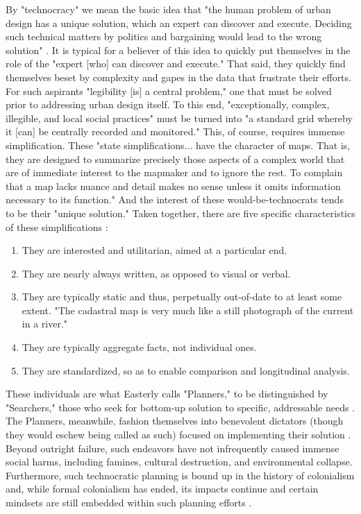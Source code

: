 By "technocracy" we mean the basic idea that "the human problem of urban design has a unique solution, which an expert can discover and execute. Deciding such technical matters by politics and bargaining would lead to the wrong solution" \cite{scottSeeingStateHow2020}. It is typical for a believer of this idea to quickly put themselves in the role of the "expert [who] can discover and execute." That said, they quickly find themselves beset by complexity and gapes in the data that frustrate their efforts. For such aspirants "legibility [is] a central problem," one that must be solved prior to addressing urban design itself. To this end, "exceptionally, complex, illegible, and local social practices" must be turned into "a standard grid whereby it [can] be centrally recorded and monitored." This, of course, requires immense simplification. These "state simplifications... have the character of maps. That is, they are designed to summarize precisely those aspects of a complex world that are of immediate interest to the mapmaker and to ignore the rest. To complain that a map lacks nuance and detail makes no sense unless it omits information necessary to its function." And the interest of these would-be-technocrats tends to be their "unique solution." Taken together, there are five specific characteristics of these simplifications \cite{scottSeeingStateHow2020}:

\begin{enumerate} \setlength{\itemsep}{0pt} \setlength{\parskip}{0pt} 
	\item{They are interested and utilitarian, aimed at a particular end.}
	\item{They are nearly always written, as opposed to visual or verbal.}
	\item{They are typically static and thus, perpetually out-of-date to at least some extent. "The cadastral map is very much like a still photograph of the current in a river."}
	\item{They are typically aggregate facts, not individual ones.}
	\item{They are standardized, so as to enable comparison and longitudinal analysis.}
\end{enumerate}

These individuals are what Easterly calls "Planners," to be distinguished by "Searchers," those who seek for bottom-up solution to specific, addressable needs \cite{easterlyWhiteManBurden2007a}. The Planners, meanwhile, fashion themselves into benevolent dictators (though they would eschew being called as such) focused on implementing their solution \cite{easterly2015}. Beyond outright failure, such endeavors have not infrequently caused immense social harms, including famines, cultural destruction, and environmental collapse. Furthermore, such technocratic planning is bound up in the history of colonialism and, while formal colonialism has ended, its impacts continue and certain mindsets are still embedded within such planning efforts \cite{sandercockCommentaryIndigenousPlanning2004}.

